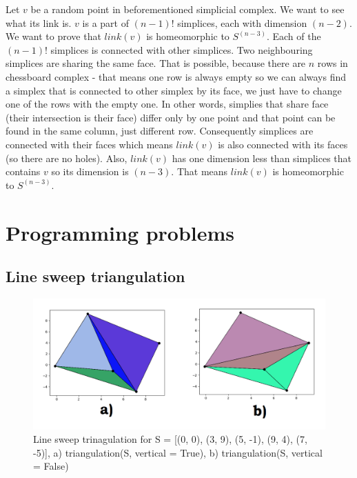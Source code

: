 \documentclass[12pt]{article}
\begin{document}
	Let $v$ be a random point in beforementioned simplicial complex. We want to see what its link is. $v$ is a part of $(n-1)!$ simplices, each with dimension $(n-2)$. We want to prove that $link(v)$ is homeomorphic to $S^{(n-3)}$. Each of the $(n-1)!$ simplices is connected with other simplices. Two neighbouring simplices are sharing the same face. That is possible, because there are $n$ rows in chessboard complex - that means one row is always empty so we can always find a simplex that is connected to other simplex by its face, we just have to change one of the rows with the empty one. In other words, simplies that share face (their intersection is their face) differ only by one point and that point can be found in the same column, just different row. Consequently simplices are connected with their faces which means $link(v)$ is also connected with its faces (so there are no holes). Also, $link(v)$ has one dimension less than simplices that contains $v$ so its dimension is $(n-3)$. That means $link(v)$ is homeomorphic to $S^{(n-3)}$.
	
	
	\section{Programming problems}
	
	\subsection{Line sweep triangulation}
	\begin{figure}
		\centering
		\includegraphics[scale=0.5] {graf7}
		\caption{\label{fig:7} Line sweep trinagulation for S = [(0, 0), (3, 9), (5, -1), (9, 4), (7, -5)], a)  triangulation(S, vertical = True), b) triangulation(S, vertical = False) }
	\end{figure}
	
\end{document}
